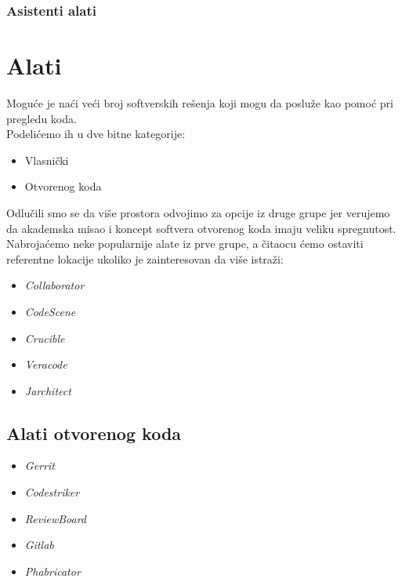 \documentclass[a4paper]{article}
\begin{document}
		\subsubsection{Asistenti alati}
			


\section{Alati}
Moguće je naći veći broj softverskih rešenja koji mogu da posluže
kao pomoć pri pregledu koda.
\\
Podelićemo ih u dve bitne kategorije:
\begin{itemize}
    \item Vlasnički
    \item Otvorenog koda
\end{itemize}
Odlučili smo se da više prostora odvojimo za opcije iz druge grupe
jer verujemo da akademska misao i koncept softvera otvorenog koda
imaju veliku spregnutost.
\\
Nabrojaćemo neke popularnije alate iz prve grupe, a čitaocu ćemo ostaviti referentne lokacije ukoliko je zainteresovan da više istraži:
\begin{itemize}
    \item \emph{Collaborator} \cite{collaborator}
    \item \emph{CodeScene} \cite{codescene}
    \item \emph{Crucible} \cite{crucible}
    \item \emph{Veracode} \cite{veracode}
    \item \emph{Jarchitect} \cite{jarchitect}
\end{itemize}
\subsection{Alati otvorenog koda}
\begin{itemize}
    \item \emph{Gerrit}
    \item \emph{Codestriker}
    \item \emph{ReviewBoard}
    \item \emph{Gitlab}
    \item \emph{Phabricator}
\end{itemize}
\end{document}

